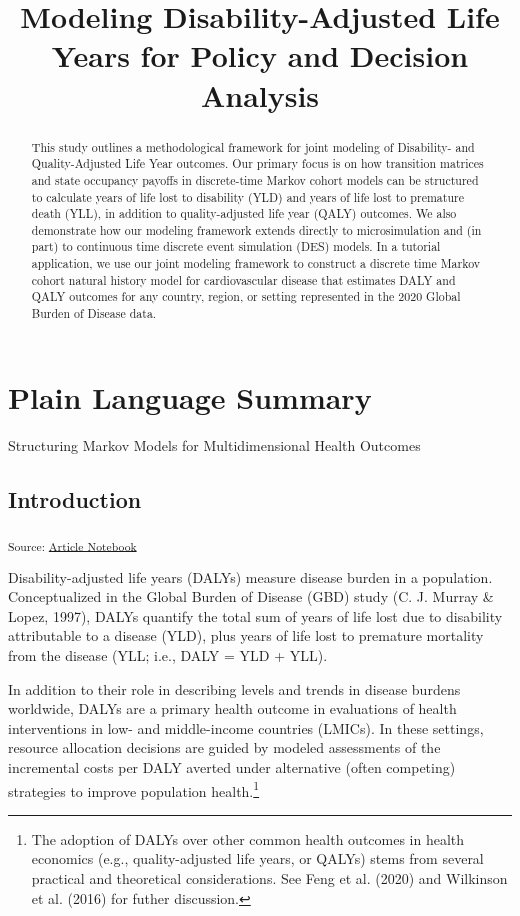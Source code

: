 \documentclass[
]{agujournal2019}
\begin{document}
\title{Modeling Disability-Adjusted Life Years for Policy and Decision
Analysis}

\authors{}




\begin{abstract}
This study outlines a methodological framework for joint modeling of
Disability- and Quality-Adjusted Life Year outcomes. Our primary focus
is on how transition matrices and state occupancy payoffs in
discrete-time Markov cohort models can be structured to calculate years
of life lost to disability (YLD) and years of life lost to premature
death (YLL), in addition to quality-adjusted life year (QALY) outcomes.
We also demonstrate how our modeling framework extends directly to
microsimulation and (in part) to continuous time discrete event
simulation (DES) models. In a tutorial application, we use our joint
modeling framework to construct a discrete time Markov cohort natural
history model for cardiovascular disease that estimates DALY and QALY
outcomes for any country, region, or setting represented in the 2020
Global Burden of Disease data.
\end{abstract}

\section*{Plain Language Summary}
Structuring Markov Models for Multidimensional Health Outcomes



\subsection{Introduction}\label{sec-introduction}

\textsubscript{Source:
\href{https://graveja0.github.io/dalys/index.qmd.html}{Article
Notebook}}

Disability-adjusted life years (DALYs) measure disease burden in a
population. Conceptualized in the Global Burden of Disease (GBD) study
(C. J. Murray \& Lopez, 1997), DALYs quantify the total sum of years of
life lost due to disability attributable to a disease (YLD), plus years
of life lost to premature mortality from the disease (YLL; i.e., DALY =
YLD + YLL).

In addition to their role in describing levels and trends in disease
burdens worldwide, DALYs are a primary health outcome in evaluations of
health interventions in low- and middle-income countries (LMICs). In
these settings, resource allocation decisions are guided by modeled
assessments of the incremental costs per DALY averted under alternative
(often competing) strategies to improve population health.\footnote{The
  adoption of DALYs over other common health outcomes in health
  economics (e.g., quality-adjusted life years, or QALYs) stems from
  several practical and theoretical considerations. See Feng et al.
  (2020) and Wilkinson et al. (2016) for futher discussion.}
\end{document}
